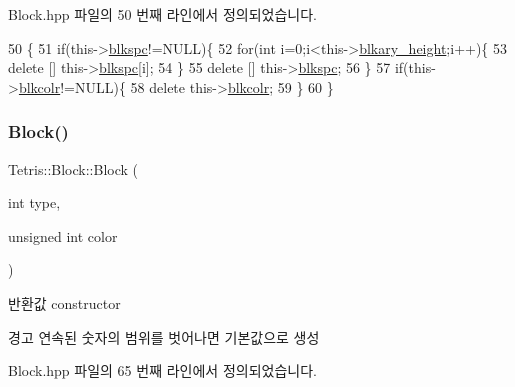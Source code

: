 Block.\+hpp 파일의 50 번째 라인에서 정의되었습니다.


\begin{DoxyCode}
50                     \{
51                 \textcolor{keywordflow}{if}(this->\hyperlink{class_tetris_1_1_block_af2f96c83a3511d32321672f794aa4db1}{blkspc}!=NULL)\{
52                     \textcolor{keywordflow}{for}(\textcolor{keywordtype}{int} i=0;i<this->\hyperlink{class_tetris_1_1_block_abbea7737c2b1fb7339aab4dff13de27c}{blkary\_height};i++)\{
53                         \textcolor{keyword}{delete} [] this->\hyperlink{class_tetris_1_1_block_af2f96c83a3511d32321672f794aa4db1}{blkspc}[i];
54                     \}
55                     \textcolor{keyword}{delete} [] this->\hyperlink{class_tetris_1_1_block_af2f96c83a3511d32321672f794aa4db1}{blkspc};
56                 \}
57                 \textcolor{keywordflow}{if}(this->\hyperlink{class_tetris_1_1_block_ab7cfb062eb49e791c94bac4a2e7a7ca9}{blkcolr}!=NULL)\{
58                     \textcolor{keyword}{delete} this->\hyperlink{class_tetris_1_1_block_ab7cfb062eb49e791c94bac4a2e7a7ca9}{blkcolr};
59                 \}
60             \}
\end{DoxyCode}
\mbox{\label{class_tetris_1_1_block_a82c3ff96d106bd1da7b32f2addd7db7f}} 
\subsubsection{\texorpdfstring{Block()}{Block()}\hspace{0.1cm}{\footnotesize\ttfamily [4/4]}}
{\footnotesize\ttfamily Tetris\+::\+Block\+::\+Block (\begin{DoxyParamCaption}\item[{int}]{type,  }\item[{unsigned int}]{color }\end{DoxyParamCaption})\hspace{0.3cm}{\ttfamily [inline]}}

\begin{DoxyReturn}{반환값}
constructor 
\end{DoxyReturn}
\begin{DoxyWarning}{경고}
연속된 숫자의 범위를 벗어나면 기본값으로 생성 
\end{DoxyWarning}


Block.\+hpp 파일의 65 번째 라인에서 정의되었습니다.


